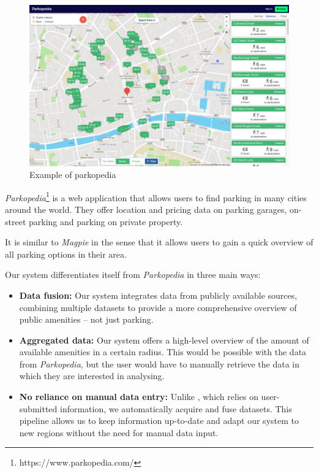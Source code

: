 \begin{figure}[h]
  \centering
  \includegraphics[width=\columnwidth]{images/parkopedia.png}
  \caption{Example of parkopedia}
  \label{fig:parkopedia}
\end{figure}

\noindent{}\textit{Parkopedia}\footnote{https://www.parkopedia.com/} is a web
application that allows users to find parking in many cities around the world.
They offer location and pricing data on parking garages, on-street parking and
parking on private property.

\noindent{}It is similar to \textit{Magpie} in the sense that it allows users to
gain a quick overview of all parking options in their area.

\noindent{}Our system differentiates itself from \textit{Parkopedia} in three
main ways:
\vspace{-3mm}
\begin{itemize}
  \item{\textbf{Data fusion:} Our system integrates data from publicly available
  sources, combining multiple datasets to provide a more comprehensive overview
  of public amenities -- not just parking.}
  \vspace{1.25mm}

  \item{\textbf{Aggregated data:} Our system offers a high-level overview of the
  amount of available amenities in a certain radius. This would be possible with
  the data from \textit{Parkopedia}, but the user would have to manually
  retrieve the data in which they are interested in analysing.}
  \vspace{1.25mm}

  \pagebreak{}

  \item{\textbf{No reliance on manual data entry:} Unlike
  , which relies on user-submitted information, we
  automatically acquire and fuse datasets. This pipeline allows us to keep
  information up-to-date and adapt our system to new regions without the need
  for manual data input.}
  \vspace{1.25mm}

\end{itemize}

